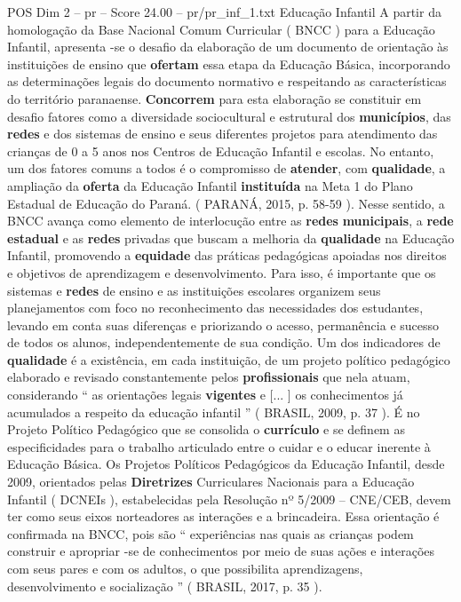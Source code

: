 \begin{textsample}{POS Dim 2 – pr – Score 24.00 – pr/pr\_inf\_1.txt}  \label{ex:f2_pos_119}
Educação Infantil A partir da homologação da Base Nacional Comum Curricular ( BNCC ) para a Educação Infantil, apresenta -se o desafio da elaboração de um documento de orientação às instituições de ensino que \textbf{ofertam} essa etapa da Educação Básica, incorporando as determinações legais do documento normativo e respeitando as características do território paranaense. \textbf{Concorrem} para esta elaboração se constituir em desafio fatores como a diversidade sociocultural e estrutural dos \textbf{municípios}, das \textbf{redes} e dos sistemas de ensino e seus diferentes projetos para atendimento das crianças de 0 a 5 anos nos Centros de Educação Infantil e escolas.
No entanto, um dos fatores comuns a todos é o compromisso de \textbf{atender}, com \textbf{qualidade}, a ampliação da \textbf{oferta} da Educação Infantil \textbf{instituída} na Meta 1 do Plano Estadual de Educação do Paraná. ( PARANÁ, 2015, p. 58-59 ).
Nesse sentido, a BNCC avança como elemento de interlocução entre as \textbf{redes} \textbf{municipais}, a \textbf{rede} \textbf{estadual} e as \textbf{redes} privadas que buscam a melhoria da \textbf{qualidade} na Educação Infantil, promovendo a \textbf{equidade} das práticas pedagógicas apoiadas nos direitos e objetivos de aprendizagem e desenvolvimento.
Para isso, é importante que os sistemas e \textbf{redes} de ensino e as instituições escolares organizem seus planejamentos com foco no reconhecimento das necessidades dos estudantes, levando em conta suas diferenças e priorizando o acesso, permanência e sucesso de todos os alunos, independentemente de sua condição.
Um dos indicadores de \textbf{qualidade} é a existência, em cada instituição, de um projeto político pedagógico elaborado e revisado constantemente pelos \textbf{profissionais} que nela atuam, considerando “ as orientações legais \textbf{vigentes} e [... ] os conhecimentos já acumulados a respeito da educação infantil ” ( BRASIL, 2009, p. 37 ).
É no Projeto Político Pedagógico que se consolida o \textbf{currículo} e se definem as especificidades para o trabalho articulado entre o cuidar e o educar inerente à Educação Básica.
Os Projetos Políticos Pedagógicos da Educação Infantil, desde 2009, orientados pelas \textbf{Diretrizes} Curriculares Nacionais para a Educação Infantil ( DCNEIs ), estabelecidas pela Resolução nº 5/2009 – CNE/CEB, devem ter como seus eixos norteadores as interações e a brincadeira.
Essa orientação é confirmada na BNCC, pois são “ experiências nas quais as crianças podem construir e apropriar -se de conhecimentos por meio de suas ações e interações com seus pares e com os adultos, o que possibilita aprendizagens, desenvolvimento e socialização ” ( BRASIL, 2017, p. 35 ).

\end{textsample}
